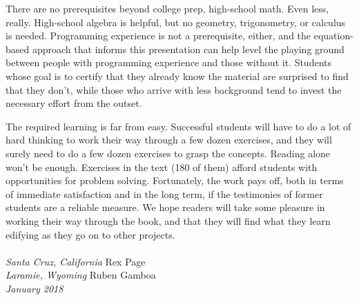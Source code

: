 There are no prerequisites beyond college prep, high-school math.
Even less, really.
High-school algebra is helpful,
but no geometry, trigonometry, or calculus is needed.
Programming experience is not a prerequisite, either, and
the equation-based approach that informs this presentation can
help level the playing ground between people
with programming experience and those without it.
Students whose goal is to certify that they already
know the material are surprised to find that they don't,
while those who arrive with less background tend
to invest the necessary effort from the outset.

The required learning is far from easy.
Successful students will have to do a lot of hard thinking
to work their way through a few dozen exercises,
and they will surely need to do a few dozen exercises to grasp the concepts.
Reading alone won't be enough.
Exercises in the text (180 of them) afford students with opportunities
for problem solving.
Fortunately, the work pays off, both in terms of immediate satisfaction
and in the long term, if the testimonies of former students are a
reliable measure.
We hope readers will take some pleasure in working their way through
the book, and that they will find what they learn
edifying as they go on to other projects.
\\
\\
\emph{Santa Cruz, California}   \hfill Rex Page     \\
\emph{Laramie, Wyoming}         \hfill Ruben Gamboa \\
\emph{January 2018}

